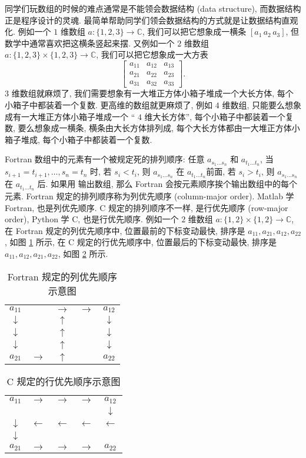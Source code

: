 同学们玩数组的时候的难点通常是不能领会数据结构 (data structure), 而数据结构正是程序设计的灵魂. 最简单帮助同学们领会数据结构的方式就是让数据结构直观化. 例如一个 $1$ 维数组 $a\!:\{1,2,3\}\to\mathbb{C}$, 我们可以把它想象成一横条 $[a_1\,a_2\,a_3]$, 但数学中通常喜欢把这横条竖起来摆. 又例如一个 $2$ 维数组 $a\!:\{1,2,3\}\times\{1,2,3\}\to\mathbb{C}$, 我们可以把它想象成一大方表
\begin{equation*}
    \begin{bmatrix}
        a_{11}&a_{12}&a_{13}\\
        a_{21}&a_{22}&a_{23}\\
        a_{31}&a_{32}&a_{33}
    \end{bmatrix}.
\end{equation*}
$3$ 维数组就麻烦了, 我们需要想象有一大堆正方体小箱子堆成一个大长方体, 每个小箱子中都装着一个复数. 更高维的数组就更麻烦了, 例如 $4$ 维数组, 只能要么想象成有一大堆正方体小箱子堆成一个 `` $4$ 维大长方体'', 每个小箱子中都装着一个复数, 要么想象成一横条, 横条由大长方体排列成, 每个大长方体都由一大堆正方体小箱子堆成, 每个小箱子中都装着一个复数.

\def\la{\leftarrow}
\def\ra{\rightarrow}
\def\ua{\uparrow}
\def\da{\downarrow}
Fortran 数组中的元素有一个被规定死的排列顺序: 任意 $a_{s_1\dots s_n}$ 和 $a_{t_1\dots t_n}$, 当 $s_{i+1}=t_{i+1},\dots,s_n=t_n$ 时, 若 $s_i<t_i$, 则 $a_{s_1\dots s_n}$ 在 $a_{t_1\dots t_n}$前面, 若 $s_i>t_i$, 则 $a_{s_1\dots s_n}$ 在 $a_{t_1\dots t_n}$ 后. 如果用  输出数组, 那么 Fortran 会按元素顺序挨个输出数组中的每个元素. Fortran 规定的排列顺序称为列优先顺序 (column-major order). Matlab 学 Fortran, 也是列优先顺序. C 规定的排列顺序不一样, 是行优先顺序 (row-major order), Python 学 C, 也是行优先顺序. 例如一个 $2$ 维数组 $a\!:\{1,2\}\times\{1,2\}\to\mathbb{C}$, 在 Fortran 规定的列优先顺序中, 位置最前的下标变动最快, 排序是 $a_{11},a_{21},a_{12},a_{22}$, 如图 \ref{column_major} 所示, 在 C 规定的行优先顺序中, 位置最后的下标变动最快, 排序是 $a_{11},a_{12},a_{21},a_{22}$, 如图 \ref{row_major} 所示.
\begin{table}[htbp]
    \centering
    \begin{tabular}{ccccc}
        $a_{11}$&&$\ra$&$\ra$&$a_{12}$\\
        $\da$&&$\ua$&&$\da$\\
        $\da$&&$\ua$&&$\da$\\
        $\da$&&$\ua$&&$\da$\\
        $a_{21}$&$\ra$&$\ua$&&$a_{22}$
    \end{tabular}
    \caption{Fortran 规定的列优先顺序示意图}
    \label{column_major}
\end{table}
\begin{table}[htbp]
    \centering
    \begin{tabular}{ccccc}
        $a_{11}$&$\ra$&$\ra$&$\ra$&$a_{12}$\\
        &&&&$\da$\\
        $\da$&$\la$&$\la$&$\la$&$\la$\\
        $\da$&&&&\\
        $a_{21}$&$\ra$&$\ra$&$\ra$&$a_{22}$
    \end{tabular}
    \caption{C 规定的行优先顺序示意图}
    \label{row_major}
\end{table}

